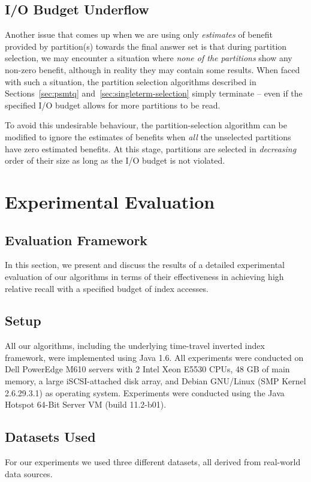 \subsection{I/O Budget Underflow}
Another issue that comes up when we are using only \emph{estimates} of
benefit provided by partition(s) towards the final answer set is that
during partition selection, we may encounter a situation where
\emph{none of the partitions} show any non-zero benefit, although in
reality they may contain some results. When faced with such a
situation, the partition selection algorithms described in
Sections~\ref{sec:psmtq} and~\ref{sec:singleterm-selection} simply terminate -- even if the specified
I/O budget allows for more partitions to be read. 

To avoid this undesirable behaviour, the partition-selection algorithm
can be modified to ignore the estimates of benefits when \emph{all}
the unselected partitions have zero estimated benefits. At this stage,
partitions are selected in \emph{decreasing} order of their size as
long as the I/O budget is not violated.

\section{Experimental Evaluation}
\label{chap:selection:sec:evaluation}


\subsection{Evaluation Framework}
\label{sec:evaluation_framework}

In this section, we present and discuss the results of a detailed
experimental evaluation of our algorithms in terms of their
effectiveness in achieving high relative recall with a specified budget of index accesses.

\subsection {Setup}
All our algorithms, including the underlying time-travel inverted
index framework, were implemented using Java 1.6.
All experiments were conducted on Dell PowerEdge M610 servers
with 2 Intel Xeon E5530 CPUs, 48 GB of main memory, a large
iSCSI-attached disk array, and Debian GNU/Linux (SMP Kernel
2.6.29.3.1) as operating system. Experiments were conducted using
the Java Hotspot 64-Bit Server VM (build 11.2-b01).

\subsection{Datasets Used}
For our experiments we used three different datasets, all derived from
real-world data sources.

